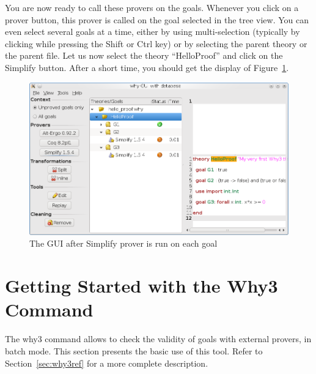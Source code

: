 You are now ready to call these provers on the goals. Whenever you
click on a prover button, this prover is called on the goal selected
in the tree view. You can even select several goals at a time, either
by using multi-selection (typically by clicking while pressing the
\textsf{Shift} or \textsf{Ctrl} key) or by selecting the parent theory
or the parent file. Let us now select the theory ``HelloProof'' and
click on the \textsf{Simplify} button. After a short time, you should
get the display of Figure~\ref{fig:gui3}.

\begin{figure}[tbp]
  \includegraphics[width=\textwidth]{gui3.png}
  \caption{The GUI after Simplify prover is run on each goal}
  \label{fig:gui3}
\end{figure}


\section{Getting Started with the Why3 Command}
\label{sec:batch}

The why3 command allows to check the validity of goals with external
provers, in batch mode. This section presents the basic use of this
tool. Refer to Section~\ref{sec:why3ref} for a more complete
description.





